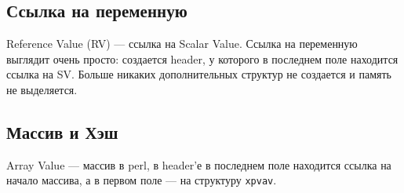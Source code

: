 \subsection{Ссылка на переменную}
Reference Value (RV) --- ссылка на Scalar Value. Ссылка на переменную выглядит очень просто: создается header, у которого в последнем поле находится ссылка на SV. Больше никаких дополнительных структур не создается и память не выделяется.

\begin{figure}[H]\centering  %
\end{figure}

\subsection{Массив и Хэш}
Array Value --- массив в perl, в header'е в последнем поле находится ссылка на начало массива, а в первом поле --- на структуру \verb|xpvav|.

